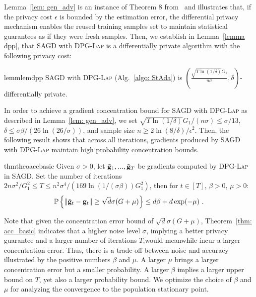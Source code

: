 \documentclass[11pt]{article}
\begin{document}
Lemma~\ref{lem: gen_adv} is an instance of Theorem 8 from~\cite{dwfe2015a} and illustrates that, if the privacy cost $\epsilon$ is bounded by the estimation error, the differential privacy mechanism enables the reused training samples set to maintain statistical guarantees as if they were fresh samples. 
Then, we establish in Lemma~\ref{lemma dpp}, that \textsc{SAGD} with \textsc{DPG-Lap} is a differentially private algorithm with the following privacy cost:
\begin{restatable}{lemm}{lemdpp}
\label{lemma dpp}
\textsc{SAGD} with \textsc{DPG-Lap} (Alg.~\ref{algo: StAda}) is $(\frac{\sqrt{T \ln(1/\delta)} G_1}{n\sigma}, \delta)$-differentially private. 
\end{restatable}  
In order to achieve a gradient concentration bound for \textsc{SAGD} with \textsc{DPG-Lap} as described in Lemma~\ref{lem: gen_adv}, we set $\sqrt{T \ln(1/\delta)} G_1/(n\sigma)\leq \sigma/13$, $\delta \leq \sigma \beta/(26 \ln(26/\sigma))$, and  sample size $n \geq 2\ln(8/\delta)/\epsilon^2$. 
Then, the following result shows that across all iterations, gradients produced by \textsc{SAGD} with \textsc{DPG-Lap} maintain high probability concentration bounds.

\begin{restatable}{thm}{theoaccbasic}
\label{thm: acc_basic}
Given $\sigma > 0$, let $\tilde {\mathbf{g}}_1,...,  \tilde {\mathbf{g}}_T$ be gradients computed by \textsc{DPG-Lap} in \textsc{SAGD}. Set the number of iterations $ 2n\sigma^2/G_1^2\leq T \leq n^2 \sigma^4/(169 \ln(1/(\sigma \beta))G_1^2)$, then for $t \in [T]$, $\beta >0$, $\mu > 0$:
    \begin{equation*}
    \mathbb{P}\left\{\|\tilde {\mathbf{g}}_t - \mathbf{g}_t\| \geq \sqrt{d}\sigma(G +\mu)\right\} \leq d\beta + d\exp(-\mu)~.
    \end{equation*}
\end{restatable}
Note that given the concentration error bound of $\sqrt{d}\sigma(G +\mu)$, Theorem~\ref{thm: acc_basic} indicates that a higher noise level $\sigma$, implying a better privacy guarantee and a larger number of iterations $T$,would meanwhile incur a larger concentration error.
Thus, there is a trade-off between noise and accuracy illustrated by the positive numbers $\beta$ and $\mu$.
A larger $\mu$ brings a larger concentration error but a smaller probability. 
A larger $\beta$ implies a larger upper bound on $T$, yet also a larger probability bound. We
optimize the choice of $\beta$ and $\mu$ for analyzing the
convergence to the population stationary point.
\end{document}
